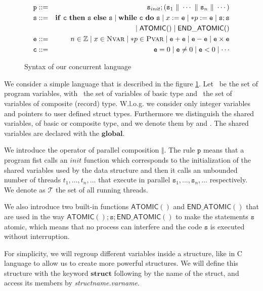 \documentclass{llncs}
\newcommand\prule{\mathtt{p}}
\newcommand\srule{\mathtt{s}}
\newcommand{\erule}{\mathtt{e}}
\newcommand{\crule}{\mathtt{c}}
\newcommand{\ifinst}{\mathbf{if}}
\newcommand{\theninst}{\mathbf{then}}
\newcommand{\elseinst}{\mathbf{else}}
\newcommand{\whileinst}{\mathbf{while}}
\newcommand{\doinst}{\mathbf{do}}
\newcommand{\structinst}{\mathbf{struct}}
\newcommand{\globalinst}{\mathbf{global}}
\newcommand{\atomicbegin}{\mathsf{ATOMIC()}}
\newcommand{\atomicend}{\mathsf{END\_ATOMIC()}}
\newcommand{\Integer}{\mathbb Z}
\newcommand{\Thread}{\mathcal T}
\newcommand{\parallelcomposition}{\Vert}
\begin{document}
    \begin{figure}
    \begin{eqnarray*}
      \prule & ::= & \srule_{init} ; (\srule_1 \ \parallelcomposition \ \cdots \ \parallelcomposition \ \srule_n \ \parallelcomposition \ \cdots)\\
      \srule & ::= & \ifinst\ \crule\ \theninst \ {\srule} \ \elseinst \ {\srule} \mid 
      				\whileinst \ \crule \ \doinst \ {\srule} \mid 
      				x := \erule \mid *p := \erule \mid
      				\srule ; \srule \\
      				& & \mid \atomicbegin \mid \atomicend \\
      \erule & ::= & n \in \Integer \mid x \in \nvars \mid *p \in \pvars \mid
      			  \erule + \erule \mid \erule - \erule \mid \erule \times \erule \\
      \crule & ::= & \erule = 0 \mid \erule \neq 0 \mid \erule < 0 \mid \cdots
    \end{eqnarray*}
    \caption{Syntax of our concurrent language}
    \label{fig:syntax}
  \end{figure}
 
	We consider a simple language that is described in the figure \ref{fig:syntax}. Let \vars\ be the set of program variables, with \nvars\ the set of  variables of basic type and \pvars\ the set of variables of composite (record) type. 
W.l.o.g. we consider only integer variables  and pointers to user defined struct types. 
Furthermore we distinguish the shared variables, of basic or composite type, and we denote them by \snvars and \spvars. The shared variables are declared with the $\globalinst$.

 We introduce the operator of parallel composition $\Vert$. The rule $\prule$ means that a program fist calls an $init$ function which corresponds to the initialization of the shared variables used by the data structure and then it calls an unbounded number of threads $t_1, \dots, t_n, \dots$ that execute in parallel $\srule_1, \dots, \srule_n, \dots$ respectively. We denote as $\Thread$ the set of all running threads. 
 
	We also introduce two built-in functions $\atomicbegin$ and $\atomicend$ that are used in the way $\atomicbegin ; \srule ; \atomicend$ to make the statements $\srule$ atomic, which means that no process can interfere and the code $\srule$ is executed without interruption. 
	
	For simplicity, we will regroup different variables inside a structure, like in C language to allow us to create more powerful structures. We will define this structure with the keyword $\structinst$ following by the name of the struct, and access its members by \textit{structname.varname}. 
	
\end{document}
